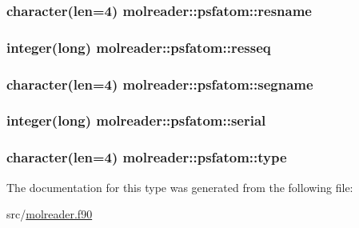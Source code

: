 \hypertarget{structmolreader_1_1psfatom_a0bd7d6afb5d4c41d84a1e278d341ec00}{
\subsubsection[{resname}]{\setlength{\rightskip}{0pt plus 5cm}character(len=4) molreader\+::psfatom\+::resname\hspace{0.3cm}{\ttfamily [private]}}}\label{structmolreader_1_1psfatom_a0bd7d6afb5d4c41d84a1e278d341ec00}
\hypertarget{structmolreader_1_1psfatom_abb34c7f3cc664d0e63be1fc695413f7a}{
\subsubsection[{resseq}]{\setlength{\rightskip}{0pt plus 5cm}integer(long) molreader\+::psfatom\+::resseq\hspace{0.3cm}{\ttfamily [private]}}}\label{structmolreader_1_1psfatom_abb34c7f3cc664d0e63be1fc695413f7a}
\hypertarget{structmolreader_1_1psfatom_aed960b86c5ddd5378e5a849a2732f650}{
\subsubsection[{segname}]{\setlength{\rightskip}{0pt plus 5cm}character(len=4) molreader\+::psfatom\+::segname\hspace{0.3cm}{\ttfamily [private]}}}\label{structmolreader_1_1psfatom_aed960b86c5ddd5378e5a849a2732f650}
\hypertarget{structmolreader_1_1psfatom_ab524e29eb9ad1beb802719121a639fa0}{
\subsubsection[{serial}]{\setlength{\rightskip}{0pt plus 5cm}integer(long) molreader\+::psfatom\+::serial\hspace{0.3cm}{\ttfamily [private]}}}\label{structmolreader_1_1psfatom_ab524e29eb9ad1beb802719121a639fa0}
\hypertarget{structmolreader_1_1psfatom_a99d2104c1a01026eef2cd329fd546f90}{
\subsubsection[{type}]{\setlength{\rightskip}{0pt plus 5cm}character(len=4) molreader\+::psfatom\+::type\hspace{0.3cm}{\ttfamily [private]}}}\label{structmolreader_1_1psfatom_a99d2104c1a01026eef2cd329fd546f90}


The documentation for this type was generated from the following file\+:\begin{DoxyCompactItemize}
\item 
src/\hyperlink{molreader_8f90}{molreader.\+f90}\end{DoxyCompactItemize}
